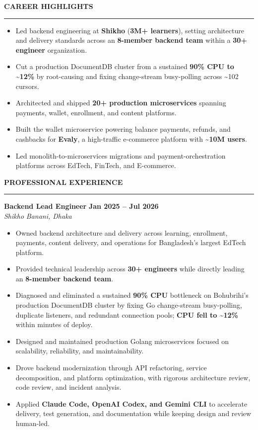 \documentclass[10pt,a4paper]{article}
\newcommand{\cvsection}[1]{%
  \vspace{0.55em}
  {\normalsize\bfseries\MakeUppercase{#1}}\par
  \vspace{0.12em}\hrule\vspace{0.28em}
}
\newcommand{\roleentry}[4]{%
  \textbf{#1} \hfill \textbf{#2}\\
  \textit{#3} \hfill \textit{#4}\par\vspace{-0.12em}
}
\newenvironment{cvitems}{%
  \begin{itemize}
    \setlength{\itemsep}{0.03em}
    \setlength{\parskip}{0pt}
    \setlength{\parsep}{0pt}
    \setlength{\topsep}{0.08em}
    \setlength{\leftmargin}{1.2em}
}{\end{itemize}}
\begin{document}
\cvsection{Career Highlights}
\begin{cvitems}
  \item Led backend engineering at \textbf{Shikho} (\textbf{3M+ learners}), setting architecture and delivery standards across an \textbf{8-member backend team} within a \textbf{30+ engineer} organization.
  \item Cut a production DocumentDB cluster from a sustained \textbf{90\% CPU to \textasciitilde{}12\%} by root-causing and fixing change-stream busy-polling across \textasciitilde{}102 cursors.
  \item Architected and shipped \textbf{20+ production microservices} spanning payments, wallet, enrollment, and content platforms.
  \item Built the wallet microservice powering balance payments, refunds, and cashbacks for \textbf{Evaly}, a high-traffic e-commerce platform with \textbf{\textasciitilde{}10M users}.
  \item Led monolith-to-microservices migrations and payment-orchestration platforms across EdTech, FinTech, and E-commerce.
\end{cvitems}

\cvsection{Professional Experience}
\roleentry{Backend Lead Engineer}{Jan 2025 -- Jul 2026}{Shikho}{Banani, Dhaka}
\begin{cvitems}
  \item Owned backend architecture and delivery across learning, enrollment, payments, content delivery, and operations for Bangladesh's largest EdTech platform.
  \item Provided technical leadership across \textbf{30+ engineers} while directly leading an \textbf{8-member backend team}.
  \item Diagnosed and eliminated a sustained \textbf{90\% CPU} bottleneck on Bohubrihi's production DocumentDB cluster by fixing Go change-stream busy-polling, duplicate listeners, and redundant connection pools; \textbf{CPU fell to \textasciitilde{}12\%} within minutes of deploy.
  \item Designed and maintained production Golang microservices focused on scalability, reliability, and maintainability.
  \item Drove backend modernization through API refactoring, service decomposition, and platform optimization, with rigorous architecture review, code review, and incident analysis.
  \item Applied \textbf{Claude Code, OpenAI Codex, and Gemini CLI} to accelerate delivery, test generation, and documentation while keeping design and review human-led.
\end{cvitems}
\end{document}
